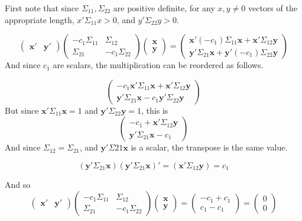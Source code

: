 \documentclass{article}
\begin{document}
\begin{enumerate}
First note that since $\Sigma_{1 1}, \Sigma_{2 2}$ are positive definite, for any $x, y \ne 0$ 
vectors of the appropriate length, $x'\Sigma_{1 1} x > 0$, and $y'\Sigma_{2 2}y > 0$.

$$
\begin{pmatrix}
\textbf{x}' & \textbf{y}'
\end{pmatrix}
\begin{pmatrix}
-c_1 \Sigma_{11} & \Sigma_{12} \\
\Sigma_{21} & -c_1 \Sigma_{22}
\end{pmatrix}
\begin{pmatrix}
\textbf{x} \\
\textbf{y}
\end{pmatrix}
= 
\begin{pmatrix}
\textbf{x}'(-c_1)\Sigma_{1 1} \textbf{x} + \textbf{x}'\Sigma_{1 2} \textbf{y} \\
\textbf{y}' \Sigma_{2 1}\textbf{x} + \textbf{y}'(-c_1)\Sigma_{2 2}\textbf{y}
\end{pmatrix}
$$
And since $c_1$ are scalars, the multiplication can be reordered as follows. 

$$
\begin{pmatrix}
-c_1\textbf{x}'\Sigma_{1 1}\textbf{x} + \textbf{x}'\Sigma_{1 2} \textbf{y} \\
\textbf{y}' \Sigma_{2 1} \textbf{x} - c_1 \textbf{y}'\Sigma_{2 2}\textbf{y}
\end{pmatrix}
$$
But since $\textbf{x}'\Sigma_{1 1}\textbf{x} = 1$ and $\textbf{y}'\Sigma_{2 2}\textbf{y} = 1$, 
this is 
$$
\begin{pmatrix}
-c_1 + \textbf{x}'\Sigma_{1 2} \textbf{y} \\
\textbf{y}' \Sigma_{2 1} \textbf{x} - c_1
\end{pmatrix}
$$
And since $\Sigma_{1 2} = \Sigma_{2 1}$, and $\textbf{y}'\Sigma{2 1}\textbf{x}$ is a scalar, 
the transpose is the same value. 

$$
(\textbf{y}'\Sigma_{2 1}\textbf{x})
(\textbf{y}'\Sigma_{2 1}\textbf{x} 
)' = (\textbf{x}'\Sigma_{1 2}\textbf{y})
= c_1
$$

And so 
$$
\begin{pmatrix}
\textbf{x}' & \textbf{y}'
\end{pmatrix}
\begin{pmatrix}
-c_1 \Sigma_{11} & \Sigma_{12} \\
\Sigma_{21} & -c_1 \Sigma_{22}
\end{pmatrix}
\begin{pmatrix}
\textbf{x} \\
\textbf{y}
\end{pmatrix}
 = 
\begin{pmatrix}
-c_1 + c_1 \\
c_1 - c_1
\end{pmatrix}
= \begin{pmatrix}
0 \\
0
\end{pmatrix}
$$

\end{enumerate}
\end{document}

